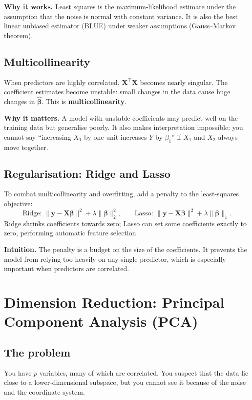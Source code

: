 \documentclass[11pt,a4paper]{article}
\newcommand{\vect}[1]{\mathbf{#1}}
\newcommand{\mat}[1]{\mathbf{#1}}
\begin{document}
\textbf{Why it works.}  Least squares is the maximum-likelihood
estimate under the assumption that the noise is normal with constant
variance.  It is also the best linear unbiased estimator (BLUE) under
weaker assumptions (Gauss–Markov theorem).

\subsection{Multicollinearity}
When predictors are highly correlated, $\mat{X}^\top\mat{X}$ becomes
nearly singular.  The coefficient estimates become unstable: small
changes in the data cause huge changes in $\hat{\boldsymbol{\beta}}$.
This is \textbf{multicollinearity}.

\textbf{Why it matters.}  A model with unstable coefficients may
predict well on the training data but generalise poorly.  It also
makes interpretation impossible: you cannot say ``increasing $X_1$ by
one unit increases $Y$ by $\beta_1$'' if $X_1$ and $X_2$ always move
together.

\subsection{Regularisation: Ridge and Lasso}
To combat multicollinearity and overfitting, add a penalty to the
least-squares objective:
\[
\text{Ridge: } \|\vect{y}-\mat{X}\boldsymbol{\beta}\|^2 +
\lambda\|\boldsymbol{\beta}\|_2^2,
\qquad
\text{Lasso: } \|\vect{y}-\mat{X}\boldsymbol{\beta}\|^2 +
\lambda\|\boldsymbol{\beta}\|_1 .
\]
Ridge shrinks coefficients towards zero; Lasso can set some
coefficients exactly to zero, performing automatic feature selection.

\textbf{Intuition.}  The penalty is a budget on the size of the
coefficients.  It prevents the model from relying too heavily on any
single predictor, which is especially important when predictors are
correlated.

\section{Dimension Reduction: Principal Component Analysis (PCA)}

\subsection{The problem}
You have $p$ variables, many of which are correlated.  You suspect that
the data lie close to a lower-dimensional subspace, but you cannot
see it because of the noise and the coordinate system.
\end{document}
